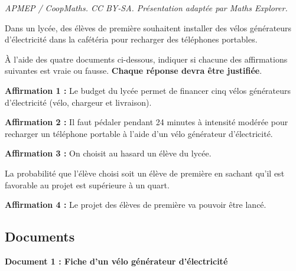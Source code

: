 \documentclass[10pt]{article}
\begin{document}
\noindent\textit{APMEP / CoopMaths. CC BY-SA. Présentation adaptée par Maths Explorer.}\par\medskip
Dans un lycée, des élèves de première souhaitent installer des vélos générateurs d'électricité dans la cafétéria pour recharger des téléphones portables.

	À l'aide des quatre documents ci-dessous, indiquer si chacune des affirmations suivantes est vraie ou fausse. \textbf{Chaque réponse devra être justifiée}.

	\bigskip

	\textbf{Affirmation 1 :} Le budget du lycée permet de financer cinq vélos générateurs d'électricité (vélo, chargeur et livraison).

	\bigskip

	\textbf{Affirmation 2 :} Il faut pédaler pendant 24 minutes à intensité modérée pour recharger un téléphone portable à l'aide d'un vélo générateur d'électricité.

	\bigskip

	\textbf{Affirmation 3 :} On choisit au hasard un élève du lycée.

	La probabilité que l'élève choisi soit un élève de première en sachant qu'il est favorable au projet est supérieure à un quart.

	\bigskip

	\textbf{Affirmation 4 :} Le projet des élèves de première va pouvoir être lancé.

	\subsection*{Documents}
	\textbf{Document 1 : Fiche d'un vélo générateur d'électricité}

	\begin{center}
	\end{center}
\end{document}
